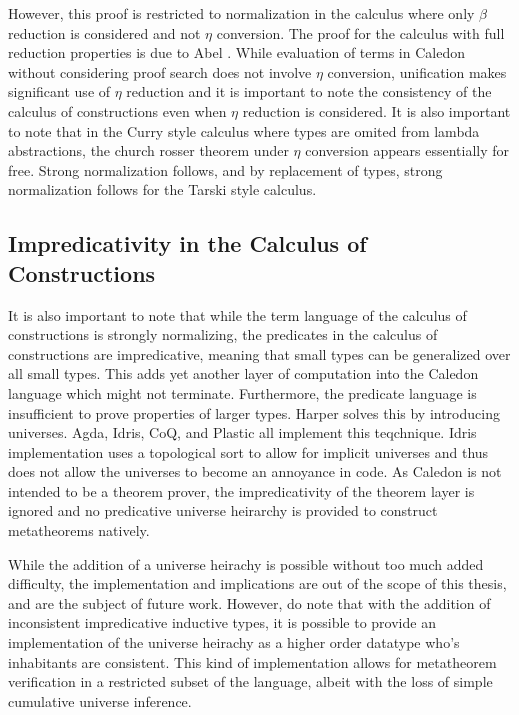 However, this proof is restricted to normalization in the calculus where only $\beta$ reduction 
is considered and not $\eta$ conversion.  The proof for the calculus with full reduction properties is due
to Abel \citep{abel2010towards}.  While evaluation of terms in Caledon without considering proof search does
not involve $\eta$ conversion, unification makes significant use of $\eta$ reduction and it is important to note
the consistency of the calculus of constructions even when $\eta$ reduction is considered.  
It is also important to note that in the Curry style calculus where types are omited from lambda abstractions, 
the church rosser theorem under $\eta$ conversion appears essentially for free\citep{miquel2001implicit}. Strong normalization 
follows, and by replacement of types, strong normalization follows for the Tarski style calculus.


\subsection{Impredicativity in the Calculus of Constructions}

It is also important to note that while the term language of the calculus of constructions is strongly normalizing, 
the predicates in the calculus of constructions are impredicative, meaning that small types can be generalized over all small types.
This adds yet another layer of computation into the Caledon language which might not terminate.  
Furthermore, the predicate language is insufficient to prove properties of larger types. 
Harper \citep{harper1991type} solves this by introducing universes.  Agda, Idris, CoQ,
and Plastic \citep{callaghan2001implementation} all implement this teqchnique. 
Idris implementation uses a topological sort to allow for implicit universes
and thus does not allow the universes to become an annoyance in code. 
As Caledon is not intended to be a theorem prover, the impredicativity of the theorem layer is ignored and no 
predicative universe heirarchy is provided to construct metatheorems natively.

While the addition of a universe heirachy is possible without too much added difficulty, 
the implementation and implications are out of the scope of this thesis, and are the subject of future work.  
However, do note that with the addition of inconsistent impredicative inductive types, it is possible to provide an implementation 
of the universe heirachy as a higher order datatype who's inhabitants are consistent.  This kind of implementation 
allows for metatheorem verification in a restricted subset of the language, albeit with the loss of 
simple cumulative universe inference.

